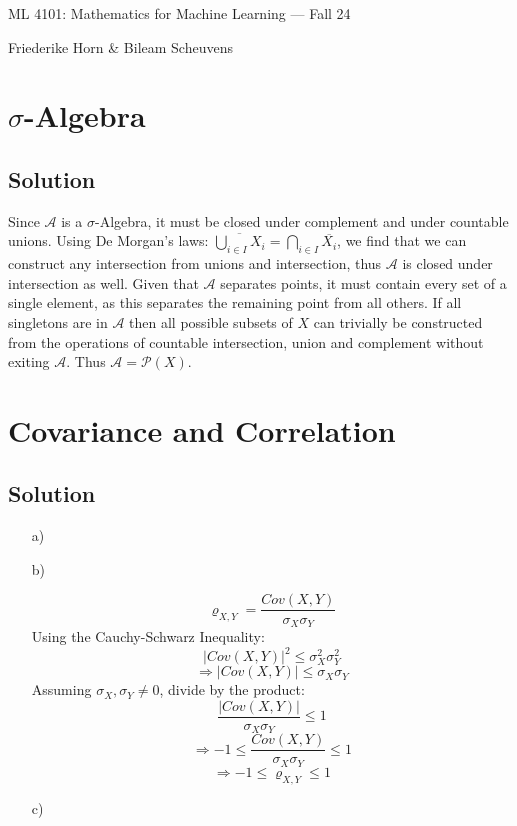 \documentclass[10pt]{article}
\numberwithin{equation}{section}
\begin{document}
\begin{center}
    \sc ML 4101: Mathematics for Machine Learning --- Fall 24
\end{center}

\noindent Friederike Horn \& Bileam Scheuvens

\section*{$\sigma$-Algebra}

\subsection*{Solution}

Since $\mathcal{A}$ is a $\sigma$-Algebra, it must be closed under complement and under countable unions.
Using De Morgan's laws: $\overline{\underset{i \in I}\bigcup X_i} = \underset{i \in I}\bigcap \overline{X_i}$, we find that we can construct any intersection from unions and intersection, thus $\mathcal{A}$ is closed under intersection as well.
Given that $\mathcal{A}$ separates points, it must contain every set of a single element, as this separates the remaining point from all others. 
If all singletons are in $\mathcal{A}$ then all possible subsets of $X$ can trivially be constructed from the operations of countable intersection, union and complement without exiting $\mathcal{A}$. Thus $\mathcal{A} = \mathcal{P}(X)$.

\section*{Covariance and Correlation}

\subsection*{Solution}
\begin{enumerate}
\item[a)]{


}
\item[b)]{
    $$\varrho_{X,Y} = \frac{Cov(X,Y)}{\sigma_X \sigma_Y}$$
    Using the Cauchy-Schwarz Inequality:
  $$|Cov(X,Y)|^2 \leq \sigma_X^2 \sigma_Y^2$$
  $$\Rightarrow |Cov(X,Y)| \leq \sigma_X \sigma_Y$$
  Assuming $\sigma_X, \sigma_Y \neq 0$, divide by the product:
  $$\frac{|Cov(X,Y)|}{\sigma_X \sigma_Y} \leq 1$$
  $$ \Rightarrow -1\leq \frac{Cov(X,Y)}{\sigma_X \sigma_Y} \leq 1$$
$$ \Rightarrow -1\leq \varrho_{X,Y} \leq 1$$

}
\item[c)]{

  }

\end{enumerate}
\end{document}
